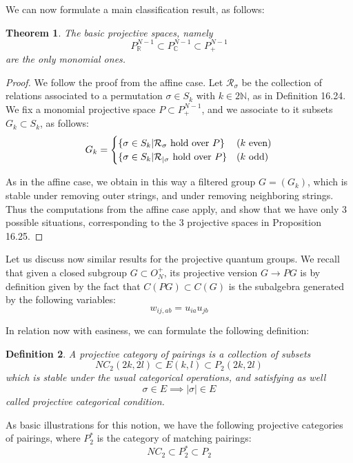 \documentclass[12pt]{amsbook}
\newtheorem{theorem}{Theorem}[chapter]
\newtheorem{definition}[theorem]{Definition}
\begin{document}
We can now formulate a main classification result, as follows:

\begin{theorem}
The basic projective spaces, namely 
$$P^{N-1}_\mathbb R\subset P^{N-1}_\mathbb C\subset P^{N-1}_+$$
are the only monomial ones.
\end{theorem}

\begin{proof}
We follow the proof from the affine case. Let $\mathcal R_\sigma$ be the collection of relations associated to a permutation $\sigma\in S_k$ with $k\in 2\mathbb N$, as in Definition 16.24. We fix a monomial projective space $P\subset P^{N-1}_+$, and we associate to it subsets $G_k\subset S_k$, as follows:
$$G_k=\begin{cases}
\{\sigma\in S_k|\mathcal R_\sigma\ {\rm hold\ over\ }P\}&(k\ {\rm even})\\
\{\sigma\in S_k|\mathcal R_{|\sigma}\ {\rm hold\ over\ }P\}&(k\ {\rm odd})
\end{cases}$$

As in the affine case, we obtain in this way a filtered group $G=(G_k)$, which is stable under removing outer strings, and under removing neighboring strings. Thus the computations from the affine case apply, and show that we have only 3 possible situations, corresponding to the 3 projective spaces in Proposition 16.25.
\end{proof}

Let us discuss now similar results for the projective quantum groups. We recall that given a closed subgroup $G\subset O_N^+$, its projective version $G\to PG$ is by definition given by the fact that $C(PG)\subset C(G)$ is the subalgebra generated by the following variables:
$$w_{ij,ab}=u_{ia}u_{jb}$$

In relation now with easiness, we can formulate the following definition:

\begin{definition}
A projective category of pairings is a collection of subsets 
$$NC_2(2k,2l)\subset E(k,l)\subset P_2(2k,2l)$$
which is stable under the usual categorical operations, and satisfying as well
$$\sigma\in E\implies |\sigma|\in E$$
called projective categorical condition.
\end{definition}

As basic illustrations for this notion, we have the following projective categories of pairings, where $P_2^*$ is the category of matching pairings:
$$NC_2\subset P_2^*\subset P_2$$
\end{document}
